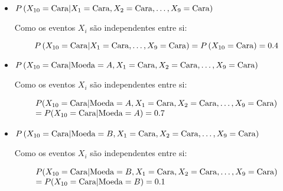\begin{itemize}
  \item $P\left( {{X_{10}} = {\rm{Cara}}|{X_1} = {\rm{Cara}},{X_2} = {\rm{Cara}}, \ldots ,{X_9} = {\rm{Cara}}} \right)$

  Como os eventos $X_i$ são independentes entre si:

  \[P\left( {{X_{10}} = {\rm{Cara}}|{X_1} = {\rm{Cara}}, \ldots ,{X_9} = {\rm{Cara}}} \right) = P\left( {{X_{10}} = {\rm{Cara}}} \right) = 0.4\]

  \item $P\left( {{X_{10}} = {\rm{Cara}}|{\rm{Moeda}} = A,{X_1} = {\rm{Cara}},{X_2} = {\rm{Cara}}, \ldots ,{X_9} = {\rm{Cara}}} \right)$

  Como os eventos $X_i$ são independentes entre si:

  \[\begin{array}{l}
P({X_{10}} = {\rm{Cara}}|{\rm{Moeda}} = A,{X_1} = {\rm{Cara}},{X_2} = {\rm{Cara}}, \ldots ,{X_9} = {\rm{Cara}})\\
 = P({X_{10}} = {\rm{Cara}}|{\rm{Moeda}} = A) = 0.7
\end{array}\]

  \item $P\left( {{X_{10}} = {\rm{Cara}}|{\rm{Moeda}} = B,{X_1} = {\rm{Cara}},{X_2} = {\rm{Cara}}, \ldots ,{X_9} = {\rm{Cara}}} \right)$

  Como os eventos $X_i$ são independentes entre si:

  \[\begin{array}{l}
P({X_{10}} = {\rm{Cara}}|{\rm{Moeda}} = B,{X_1} = {\rm{Cara}},{X_2} = {\rm{Cara}}, \ldots ,{X_9} = {\rm{Cara}})\\
 = P({X_{10}} = {\rm{Cara}}|{\rm{Moeda}} = B) = 0.1
\end{array}\]

\end{itemize}
